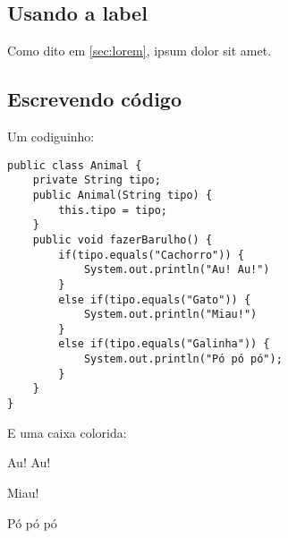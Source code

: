 \subsection{Usando a label}

Como dito em \ref{sec:lorem}, ipsum dolor sit amet.

 
\subsection{Escrevendo código}

Um codiguinho:

\begin{lstlisting}[caption=Classe dos animais]
public class Animal {
    private String tipo;
    public Animal(String tipo) {
        this.tipo = tipo;
    }
    public void fazerBarulho() {
        if(tipo.equals("Cachorro")) {
            System.out.println("Au! Au!")
        }
        else if(tipo.equals("Gato")) {
            System.out.println("Miau!")
        }
        else if(tipo.equals("Galinha")) {
            System.out.println("Pó pó pó");
        }
    }
}
\end{lstlisting}

E uma caixa colorida:

\begin{tcolorbox}
Au! Au!\par
Miau!\par
Pó pó pó
\end{tcolorbox} 
 
